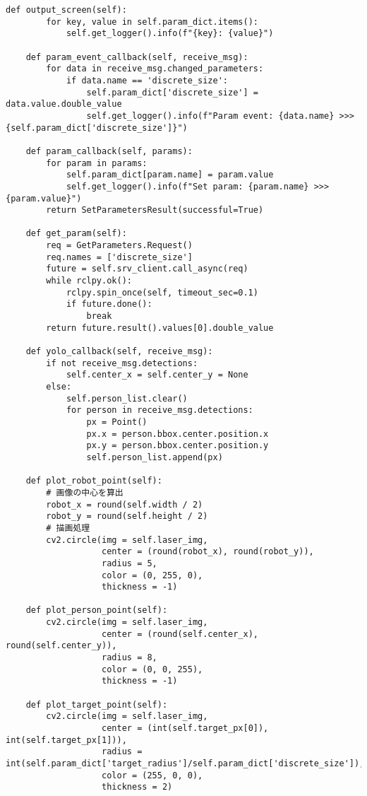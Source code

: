 \begin{lstlisting}[caption=person\_detector.py, label=person]
    def output_screen(self):
        for key, value in self.param_dict.items():
            self.get_logger().info(f"{key}: {value}")

    def param_event_callback(self, receive_msg):
        for data in receive_msg.changed_parameters:
            if data.name == 'discrete_size':
                self.param_dict['discrete_size'] = data.value.double_value
                self.get_logger().info(f"Param event: {data.name} >>> {self.param_dict['discrete_size']}")

    def param_callback(self, params):
        for param in params:
            self.param_dict[param.name] = param.value
            self.get_logger().info(f"Set param: {param.name} >>> {param.value}")
        return SetParametersResult(successful=True)
    
    def get_param(self):
        req = GetParameters.Request()
        req.names = ['discrete_size']
        future = self.srv_client.call_async(req)
        while rclpy.ok():
            rclpy.spin_once(self, timeout_sec=0.1)
            if future.done():
                break
        return future.result().values[0].double_value

    def yolo_callback(self, receive_msg):
        if not receive_msg.detections:
            self.center_x = self.center_y = None
        else:
            self.person_list.clear()
            for person in receive_msg.detections:
                px = Point()
                px.x = person.bbox.center.position.x
                px.y = person.bbox.center.position.y
                self.person_list.append(px)

    def plot_robot_point(self):
        # 画像の中心を算出
        robot_x = round(self.width / 2)
        robot_y = round(self.height / 2)
        # 描画処理
        cv2.circle(img = self.laser_img,
                   center = (round(robot_x), round(robot_y)),
                   radius = 5,
                   color = (0, 255, 0),
                   thickness = -1)

    def plot_person_point(self):
        cv2.circle(img = self.laser_img,
                   center = (round(self.center_x), round(self.center_y)),
                   radius = 8,
                   color = (0, 0, 255),
                   thickness = -1)

    def plot_target_point(self):
        cv2.circle(img = self.laser_img,
                   center = (int(self.target_px[0]), int(self.target_px[1])),
                   radius = int(self.param_dict['target_radius']/self.param_dict['discrete_size']),
                   color = (255, 0, 0),
                   thickness = 2)


\end{lstlisting}
